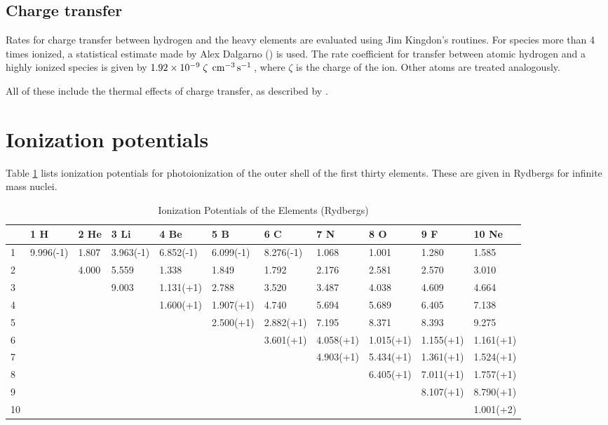 \subsection{Charge transfer}

Rates for charge transfer between hydrogen and the heavy elements are
evaluated using Jim Kingdon's routines.   For species more than 4 times
ionized, a statistical estimate made by Alex Dalgarno (\citealp{Ferland1997})
is used.  The rate coefficient for transfer between atomic hydrogen and
a highly ionized species is given by
$1.92\times 10^{-9} \; \zeta \; {\rm\thinspace cm^{-3}} \mbox{${\rm\thinspace s}^{-1}\,$}$,
where $\zeta$ is the
charge of the ion.  Other atoms are treated analogously.

All of these include the thermal effects of charge transfer, as described
by \citet{Kingdon1998b}.

\section{Ionization potentials}

Table \ref{tab:IonizationPotentials} lists ionization potentials for photoionization of the outer
shell of the first thirty elements.  These are given in Rydbergs for infinite
mass nuclei.

\begin{table}
\begin{center}
\scriptsize
\caption{Ionization Potentials of the Elements (Rydbergs)}
\label{tab:IonizationPotentials}
\begin{tabular}{lllllllllll}
\hline
&1 H& 2 He& 3 Li& 4 Be& 5 B& 6 C& 7 N& 8 O& 9 F& 10 Ne\\
\hline
1& 9.996(-1)& 1.807& 3.963(-1)& 6.852(-1)& 6.099(-1)& 8.276(-1)& 1.068&
1.001& 1.280& 1.585\\
2&& 4.000& 5.559&
1.338& 1.849& 1.792& 2.176& 2.581& 2.570& 3.010\\
3&&&  9.003& 1.131(+1)& 2.788& 3.520&
3.487& 4.038& 4.609& 4.664\\
4&&&&  1.600(+1)& 1.907(+1)& 4.740& 5.694& 5.689& 6.405& 7.138\\
5&&&&&  2.500(+1)& 2.882(+1)& 7.195& 8.371& 8.393& 9.275\\
6&&&&&&
3.601(+1)& 4.058(+1)& 1.015(+1)& 1.155(+1)& 1.161(+1)\\
7&&&&&&& 4.903(+1)& 5.434(+1)& 1.361(+1)& 1.524(+1)\\
8&&&&&&&& 6.405(+1)& 7.011(+1)& 1.757(+1)\\
9&&&&&&&&& 8.107(+1)& 8.790(+1)\\
10&&&&&&&&&& 1.001(+2)\\
\hline
\end{tabular}
\end{center}
\end{table}

